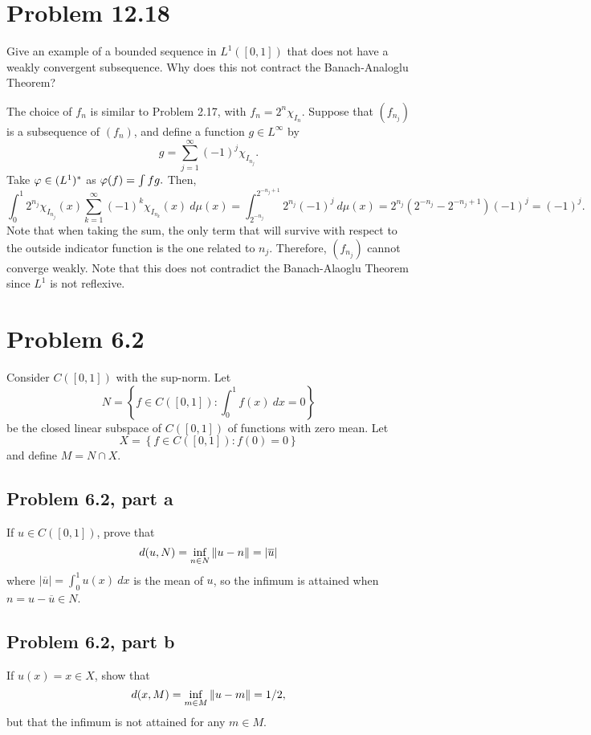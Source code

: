 \newpage
\section{Problem 12.18}
Give an example of a bounded sequence in $L^1([0, 1])$ that does not have a weakly convergent subsequence. Why does this not contract the Banach-Analoglu Theorem?
\partbreak
\begin{solution}

    The choice of $f_n$ is similar to Problem 2.17, with $f_n = 2^n \chi_{I_n}$. Suppose that $(f_{n_j})$ is a subsequence of $(f_n)$, and define a function $g \in L^\infty$ by 
    \[g = \sum_{j = 1}^\infty (-1)^j \chi_{I_{n_j}}.\]
    Take $\varphi \in (L^1)^*$ as $\varphi (f) = \int fg.$ Then,
    \[\int_0^1 2^{n_j} \chi_{I_{n_j}}(x) \sum_{k = 1}^\infty (-1)^k\chi_{I_{n_k}}(x) \ d\mu(x) = \int_{2^{-n_j}}^{2^{-n_j + 1}} 2^{n_j} (-1)^j \ d\mu(x) = 2^{n_j}(2^{-n_j} - 2^{-n_j + 1})(-1)^j = (-1)^j. \]
    Note that when taking the sum, the only term that will survive with respect to the outside indicator function is the one related to $n_j$. Therefore, $(f_{n_j})$ cannot converge weakly. Note that this does not contradict the Banach-Alaoglu Theorem since $L^1$ is not reflexive.
\end{solution}

\newpage
\section{Problem 6.2}
Consider $C([0, 1])$ with the sup-norm. Let 
\[N = \left \{ f \in C([0, 1]) : \int_0^1 f(x) \ dx = 0\right\}\]
be the closed linear subspace of $C([0, 1])$ of functions with zero mean. Let 
\[X = \left\{ f \in C([0, 1]) : f(0) = 0\right\}\]
and define $M = N \cap X$. 
\subsection{Problem 6.2, part a}
If $u \in C([0, 1])$, prove that 
\[d(u, N) = \inf_{n \in N} \norm{u - n} = |\overline{u}|\]
where $|\overline{u}| = \int_0^1 u(x) \ dx$ is the mean of $u$, so the infimum is attained when $n = u - \overline{u} \in N$. 

\newpage
\subsection{Problem 6.2, part b}
If $u(x) = x \in X$, show that
\[d(x, M) = \inf_{m \in M}\norm{u - m} = 1/2,\]
but that the infimum is not attained for any $m \in M$.

